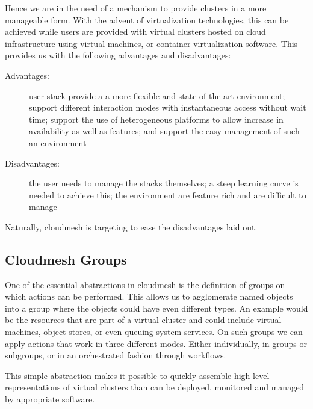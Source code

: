  Hence we are in the need of a mechanism to provide
clusters in a more manageable form. With the advent of virtualization
technologies, this can be achieved while users are provided with
virtual clusters hosted on cloud infrastructure using virtual machines,
or container virtualization software. This provides us with the
following advantages and disadvantages:

\begin{description}

\item[Advantages:] user stack provide a a more flexible and
  state-of-the-art environment; support different interaction modes
  with instantaneous access without wait time; support the use of
  heterogeneous platforms to allow increase in availability as well as
  features; and support the easy management of such an environment

\item[Disadvantages:] the user needs to manage the stacks themselves; a
  steep learning curve is needed to achieve this; the environment are
  feature rich and are difficult to manage

\end{description}

Naturally, cloudmesh is targeting to ease the disadvantages laid out.

\subsection{Cloudmesh Groups} \label{S:groups}

One of the essential abstractions in cloudmesh is the definition of
groups on which actions can be performed. This allows us to
agglomerate named objects into a group where the objects could have
even different types. An example would be the resources that are part
of a virtual cluster and could include virtual machines, object stores,
or even queuing system services. On such groups we can apply actions
that work in three different modes. Either individually, in groups or
subgroups, or in an orchestrated fashion through workflows.

This simple abstraction makes it possible to quickly assemble high
level representations of virtual clusters than can be deployed,
monitored and managed by appropriate software. 



